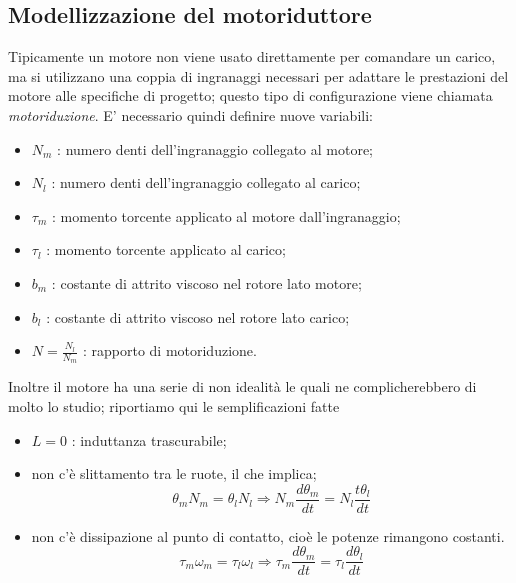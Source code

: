 \documentclass[english]{article}
\begin{document}
	\subsection{Modellizzazione del motoriduttore}
	\label{subsec:ModellizzazioneMotoriduttore}
	
		Tipicamente un motore non viene usato direttamente per comandare un carico, ma si utilizzano una coppia di ingranaggi necessari per adattare le prestazioni del motore alle specifiche di progetto; questo tipo di configurazione viene chiamata \textit{motoriduzione}. E' necessario quindi definire nuove variabili:
	
		\begin{itemize}
			\item $N_m$ : numero denti dell'ingranaggio collegato al motore;
			\item $N_l$ : numero denti dell'ingranaggio collegato al carico;
			\item $\tau_m$ : momento torcente applicato al motore dall'ingranaggio;
			\item $\tau_l$ : momento torcente applicato al carico;
			\item $b_m$ : costante di attrito viscoso nel rotore lato motore;
			\item $b_l$ : costante di attrito viscoso nel rotore lato carico;
			\item $N = \frac{N_l}{N_m}$ : rapporto di motoriduzione.
		\end{itemize}  
	
		\noindent Inoltre il motore ha una serie di non idealità le quali ne complicherebbero di molto lo studio; riportiamo qui le semplificazioni fatte
	
		\begin{itemize}
			\item $L = 0$ : induttanza trascurabile;
			\item non c'è slittamento tra le ruote, il che implica;
			\begin{equation}
				\theta_mN_m = \theta_lN_l \Longrightarrow N_m\frac{d\theta_m}{dt}=N_l\frac{t\theta_l}{dt}
				\label{eq:nonIdealità1}
			\end{equation}
			\item non c'è dissipazione al punto di contatto, cioè le potenze rimangono costanti.
			\begin{equation}
				\tau_m\omega_m=\tau_l\omega_l \Longrightarrow \tau_m\frac{d\theta_m}{dt}=\tau_l\frac{d\theta_l}{dt}
				\label{eq:nonIdealità2}  
			\end{equation}
		\end{itemize}
	
\end{document}
